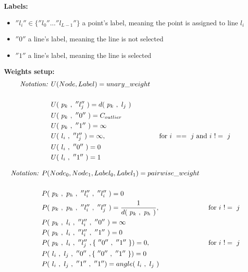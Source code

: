 \documentclass[11pt]{article}
\begin{document}
\par\textbf{Labels:} \begin{itemize}
			\item $''l_i'' \in \{''l_0'' \ldots ''l_{L-1}''\}$ a point's label, meaning the point is assigned to line $l_i$
            \item $''0''$ a line's label, meaning the line is not selected
            \item $''1''$ a line's label, meaning the line is selected
        \end{itemize}

\par\textbf{Weights setup:}
\begin{align}
\textit{Notation: } & U(Node,Label) = unary\_weight \notag \\
\notag
\\ & U(~p_k~,~''l_j''~) = d(~p_k~,~l_j~) \label{eq:primdist}
\\ & U(~p_k~,~''0''~) = C_{outlier} \label{eq:outlier_point}
\\ & U(~p_k~,~''1''~) = \infty \label{eq:point_one_label}
\\ & U(~l_i~,~''l_j''~) = \infty, ~~~&\text{ for $i~==~j$ and $i~!=~j$ } \label{eq:line_line_label}
\\ & U(~l_i~,~''0''~) = 0 \label{eq:line_null_label}
\\ & U(~l_i~,~''1''~) = 1 \label{eq:line_one_label}
\end{align}

\begin{align}
\textit{Notation: } & P(Node_0, Node_1, Label_0, Label_1) = pairwise\_weight \notag \\
\notag
\\ & P(~p_k~,~p_h~,~''l_i''~,~''l_i''~) = 0 \label{eq:point_point_same}
\\ & P(~p_k~,~p_h~,~''l_i''~,~''l_j''~) = \frac{1}{d(~p_k~,~p_h~)}, ~~~&\text{ for $i~!=~j$ } \label{eq:point_point_diff}
%
\\ & P(~p_k~,~l_i~,~''l_i''~,~''0''~) = \infty \label{eq:point_line_off}
\\ & P(~p_k~,~l_i~,~''l_i''~,~''1''~) = 0 \label{eq:point_line_on} %
%
\\ & P(~p_k~,~l_i~,~''l_j''~,\{~''0''~,~''1''~\}) = 0, ~~~&\text{ for $i~!=~j$ } \label{eq:point_other_line}
\\ & P(~l_i~,~l_j~,~''0''~,\{~''0''~,~''1''~\}) = 0 \label{eq:line_line_off}
\\ & P(~l_i~,~l_j~,~''1''~,~''1'') = angle(~l_i~,~l_j~) \label{eq:line_line_on}
\end{align}
\end{document}
